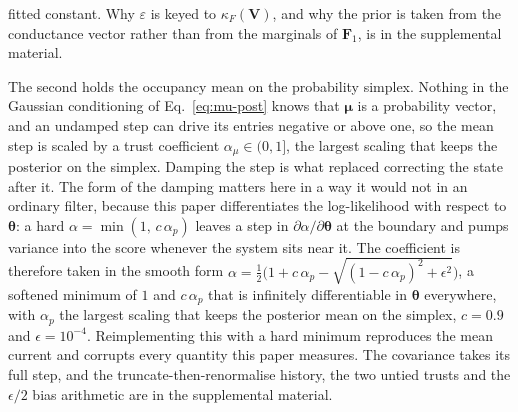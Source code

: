 fitted constant. Why $\varepsilon$ is keyed to $\kappa_F(\mathbf{V})$, and why the prior is
taken from the conductance vector rather than from the marginals of $\mathbf{F}_1$, is in
the supplemental material.

The second holds the occupancy mean on the probability simplex. Nothing in the Gaussian
conditioning of Eq.~\ref{eq:mu-post} knows that $\boldsymbol{\mu}$ is a probability vector, and an
undamped step can drive its entries negative or above one, so the mean step is scaled
by a trust coefficient $\alpha_\mu\in(0,1]$, the largest scaling that keeps the posterior
on the simplex. Damping the step is what replaced correcting the state after it. The form of
the damping matters here in a way it would not in an ordinary filter, because this paper
differentiates the log-likelihood with respect to $\boldsymbol{\theta}$: a hard
$\alpha=\min(1,\,c\,\alpha_p)$ leaves a step in $\partial\alpha/\partial\boldsymbol{\theta}$ at the
boundary and pumps variance into the score whenever the system sits near it. The coefficient is
therefore taken in the smooth form
$\alpha = \tfrac12\bigl(1 + c\,\alpha_p - \sqrt{(1-c\,\alpha_p)^2+\epsilon^2}\bigr)$, a softened
minimum of $1$ and $c\,\alpha_p$ that is infinitely differentiable in $\boldsymbol{\theta}$ everywhere,
with $\alpha_p$ the largest scaling that keeps the posterior mean on the simplex, $c = 0.9$ and
$\epsilon = 10^{-4}$. Reimplementing this with a hard minimum reproduces the mean current and
corrupts every quantity this paper measures. The covariance takes its full step, and the
truncate-then-renormalise history, the two untied trusts and the $\epsilon/2$ bias arithmetic
are in the supplemental material.

